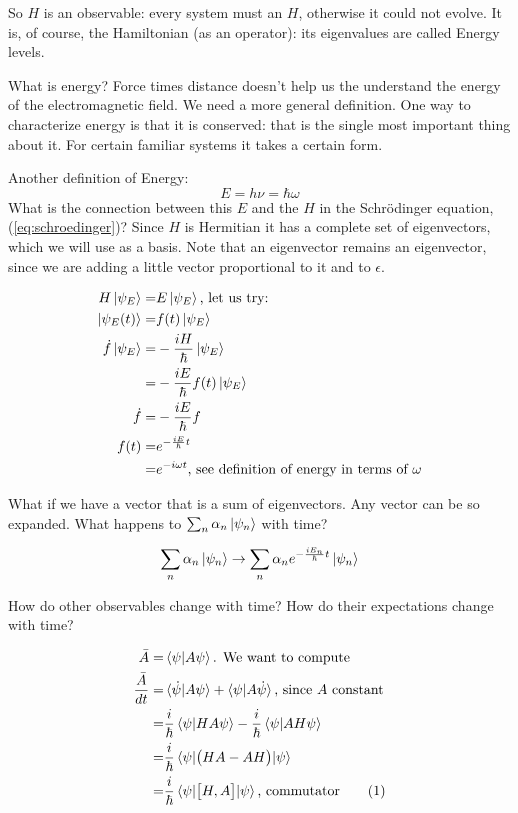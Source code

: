 \documentclass[]{article}
\newcommand\numberthis{\addtocounter{equation}{1}\tag{\theequation}}
\begin{document}
So $H$ is an observable: every system must an $H$, otherwise it could not evolve. It is, of course, the Hamiltonian (as an operator): its eigenvalues are called Energy levels.

What is energy? Force times distance doesn't help us the understand the energy of the electromagnetic field.  We need a more general definition. One way to characterize energy is that it is conserved: that is the single most important thing about it. For certain familiar systems it takes a certain form.

Another definition of Energy:
$$E = h\nu = \hbar \omega$$
What is the connection between this $E$ and the $H$ in the Schr\"odinger equation, (\ref{eq:schroedinger})? Since $H$ is Hermitian it has a complete set of eigenvectors, which we will use as a basis. Note that an eigenvector remains an eigenvector, since we are adding a little vector proportional to it and to $\epsilon$.

\begin{align*}
	H\ket{\psi_E} =& E\ket{\psi_E}\text{, let us try:}\\
	\ket{\psi_E(t)} =& f(t)\ket{\psi_E}\\
	\dot{f}\ket{\psi_E} =& -\frac{iH}{\hbar}\ket{\psi_E}\\
	=& -\frac{iE}{\hbar} f(t) \ket{\psi_E}\\
	\dot{f}=& -\frac{iE}{\hbar} f\\
	f(t) =& e^{-\frac{iE}{\hbar}t}\\
	=& e^{-i \omega t} \text{, see definition of energy in terms of $\omega$}
\end{align*}

What if we have a vector that is a sum of eigenvectors. Any vector can be so expanded. What happens to $\sum_n \alpha_n \ket{\psi_n}$ with time?

\begin{align*}
	\sum_n \alpha_n \ket{\psi_n} \rightarrow \sum_n \alpha_n e^{-\frac{iE_n}{\hbar}t} \ket{\psi_n}
\end{align*}

How do other observables change with time? How do their expectations change with time?

\begin{align*}
	\bar{A} =&\braket{\psi\vert A \psi}\text{. We want to compute}\\
	\frac{\bar{A}}{dt} =&	\braket{\dot{\psi}\vert A \psi} + \braket{\psi\vert A \dot{\psi}} \text{, since $A$ constant}\\
	=& \frac{i}{\hbar}\braket{\psi\vert H A \psi} - \frac{i}{\hbar}\braket{\psi\vert A H \psi}\\
	=& \frac{i}{\hbar} \braket{\psi \vert \big(HA-AH\big)\vert \psi}\\
	=& \frac{i}{\hbar} \braket{\psi \vert \big[H,A\big]\vert \psi} \text {, commutator} \numberthis \label{eq:evolve:state}
\end{align*}
\end{document}
